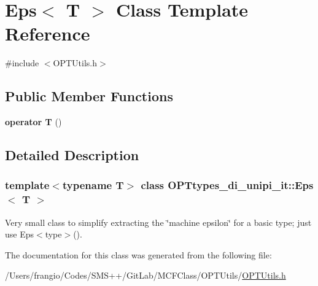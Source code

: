\hypertarget{class_o_p_ttypes__di__unipi__it_1_1_eps}{}\section{Eps$<$ T $>$ Class Template Reference}
\label{class_o_p_ttypes__di__unipi__it_1_1_eps}


{\ttfamily \#include $<$O\+P\+T\+Utils.\+h$>$}

\subsection*{Public Member Functions}
\begin{DoxyCompactItemize}
\item 
\mbox{\label{class_o_p_ttypes__di__unipi__it_1_1_eps_a4b15b6419d4ff99730ee9df795b90f61}} 
{\bfseries operator T} ()
\end{DoxyCompactItemize}


\subsection{Detailed Description}
\subsubsection*{template$<$typename T$>$\newline
class O\+P\+Ttypes\+\_\+di\+\_\+unipi\+\_\+it\+::\+Eps$<$ T $>$}

Very small class to simplify extracting the \char`\"{}machine epsilon\char`\"{} for a basic type; just use Eps$<$type$>$(). 

The documentation for this class was generated from the following file\+:\begin{DoxyCompactItemize}
\item 
/\+Users/frangio/\+Codes/\+S\+M\+S++/\+Git\+Lab/\+M\+C\+F\+Class/\+O\+P\+T\+Utils/\mbox{\hyperlink{_o_p_t_utils_8h}{O\+P\+T\+Utils.\+h}}\end{DoxyCompactItemize}
